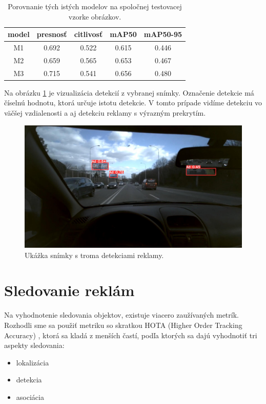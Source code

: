 \begin{table}[ht]
\centering
\begin{tabular}{ |c c c c c|  }
\hline
model & presnosť & citlivosť & mAP50 & mAP50-95 \\
\hline
M1  & 0.692	& 0.522	& 0.615	& 0.446 \\
M2  & 0.659 & 0.565 & 0.653 & 0.467 \\
M3  & 0.715 & 0.541 & 0.656 & 0.480 \\
\hline
\end{tabular}
\caption{Porovnanie tých istých modelov na spoločnej testovacej vzorke obrázkov.}
\label{table:test2}
\end{table}

Na obrázku \ref{img:dt7} je vizualizácia detekcií z vybranej snímky. Označenie detekcie má číselnú hodnotu, ktorá určuje istotu detekcie. V tomto prípade vidíme detekciu vo väčšej vzdialenosti a aj detekciu reklamy s výrazným prekrytím.

\begin{figure}[ht]
    \centering
    \includegraphics[width=1\textwidth]{images/05/120.jpg}
    \caption{Ukážka snímky s troma detekciami reklamy.}
    \label{img:dt7}
\end{figure}

\section{Sledovanie reklám}

Na vyhodnotenie sledovania objektov, existuje viacero zaužívaných metrík. Rozhodli sme sa použiť metriku so skratkou HOTA (Higher Order Tracking Accuracy) \cite{hota}, ktorá sa kladá z menších častí, podľa ktorých sa dajú vyhodnotiť tri aspekty sledovania:

\begin{itemize}
    \item lokalizácia
    \item detekcia
    \item asociácia
\end{itemize}

